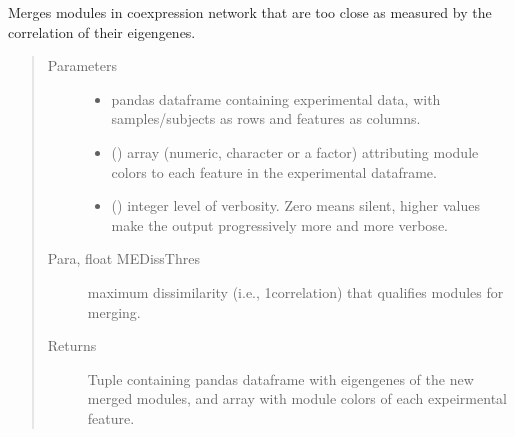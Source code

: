 \documentclass[letterpaper,10pt,english]{sphinxmanual}
\begin{document}

\begin{fulllineitems}
\label{\detokenize{_autosummary/analytics_core.analytics:analytics_core.analytics.wgcnaAnalysis.merge_similar_modules}}
Merges modules in co\sphinxhyphen{}expression network that are too close as measured by the correlation of their eigengenes.
\begin{quote}\begin{description}
\item[{Parameters}] \leavevmode\begin{itemize}
\item {} 
 \textendash{} pandas dataframe containing experimental data, with samples/subjects as rows and features as columns.

\item {} 
 () \textendash{} array (numeric, character or a factor) attributing module colors to each feature in the experimental dataframe.

\item {} 
 () \textendash{} integer level of verbosity. Zero means silent, higher values make the output progressively more and more verbose.

\end{itemize}

\item[{Para, float MEDissThres}] \leavevmode
maximum dissimilarity (i.e., 1\sphinxhyphen{}correlation) that qualifies modules for merging.

\item[{Returns}] \leavevmode
Tuple containing pandas dataframe with eigengenes of the new merged modules, and array with module colors of each expeirmental feature.

\end{description}\end{quote}

\end{fulllineitems}
\end{document}

